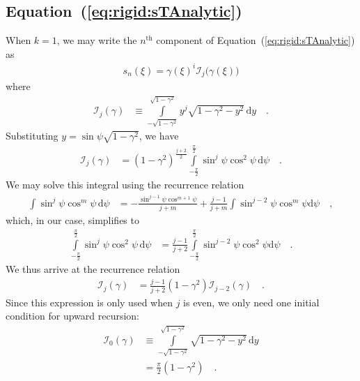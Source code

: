 \documentclass[modern]{aastex62}
\begin{document}
\subsection{Equation~(\ref{eq:rigid:sTAnalytic})}
%
When $k = 1$, we may write the $n^\mathrm{th}$ component
of Equation~(\ref{eq:rigid:sTAnalytic}) as
%
\begin{align}
    s_n(\xi) = 
        \gamma(\xi)^{i}
        \mathcal{I}_{j}\big(\gamma(\xi)\big)
\end{align}
%
where
%
\begin{align}
    \mathcal{I}_j(\gamma) &\equiv
    \int\limits_{-\sqrt{1-\gamma^2}}^{\sqrt{1-\gamma^2}}
        y^{j}
        \sqrt{1 - \gamma^2 - y^2} \,
    \mathrm{d}y
    \quad.
\end{align}
%
Substituting $y = \sin\psi\sqrt{1 - \gamma^2}$, we have
%
\begin{align}
    \mathcal{I}_j(\gamma) &=
    (1 - \gamma^2)^{\frac{j + 2}{2}}
    \int\limits_{-\frac{\pi}{2}}^{\frac{\pi}{2}}
        \sin^j\psi
        \cos^2\psi \,
    \mathrm{d}\psi
    \quad.
\end{align}
%
We may solve this integral using the recurrence relation
%
\begin{align}
    \int
        \sin^j\psi
        \cos^m\psi \,
    \mathrm{d}\psi
    &=
    -\frac{\sin^{j-1}\psi \cos^{m+1}\psi}{j + m}
    +
    \frac{j - 1}{j + m}\int\sin^{j-2}\psi \cos^m\psi \mathrm{d}\psi
    \quad ,
\end{align}
%
which, in our case, simplifies to
%
\begin{align}
    \int\limits_{-\frac{\pi}{2}}^{\frac{\pi}{2}}
        \sin^j\psi
        \cos^2\psi \,
    \mathrm{d}\psi
    &=
    \frac{j - 1}{j + 2}\int\limits_{-\frac{\pi}{2}}^{\frac{\pi}{2}}\sin^{j-2}\psi \cos^2\psi \mathrm{d}\psi
    \quad.
\end{align}
%
We thus arrive at the recurrence relation
%
\begin{align}
    \label{eq:app:Ij}
    \mathcal{I}_j(\gamma) &=
    \frac{j - 1}{j + 2}
    (1 - \gamma^2)
    \mathcal{I}_{j-2}(\gamma)
    \quad.
\end{align}
%
Since this expression is only used when $j$ is even, we only need one
initial condition for upward recursion:
%
\begin{align}
    \label{eq:app:I0}
    \mathcal{I}_0(\gamma) &\equiv
    \int\limits_{-\sqrt{1-\gamma^2}}^{\sqrt{1-\gamma^2}}
        \sqrt{1 - \gamma^2 - y^2} \,
    \mathrm{d}y
    \nonumber \\
    &= \frac{\pi}{2}(1 - \gamma^2)
    \quad.
\end{align}


\end{document}
